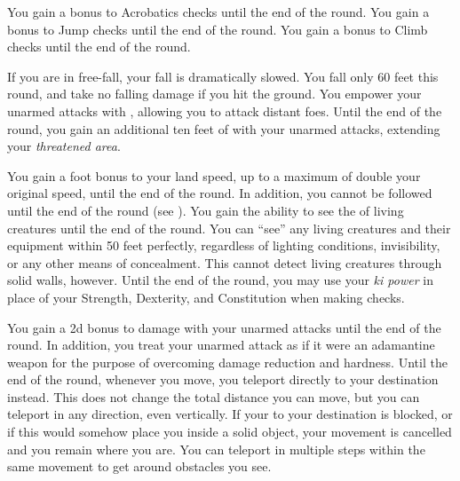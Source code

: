             You gain a  bonus to Acrobatics checks until the end of the round.
            You gain a  bonus to Jump checks until the end of the round.
            You gain a  bonus to Climb checks until the end of the round.

            If you are in free-fall, your fall is dramatically slowed.
            You fall only 60 feet this round, and take no falling damage if you hit the ground.
            You empower your unarmed attacks with \ki, allowing you to attack distant foes.
            Until the end of the round, you gain an additional ten feet of  with your unarmed attacks, extending your \textit{threatened area}.

            You gain a  foot bonus to your land speed, up to a maximum of double your original speed, until the end of the round.
            In addition, you cannot be followed until the end of the round (see ).
            You gain the ability to see the \ki of living creatures until the end of the round.
            You can ``see'' any living creatures and their equipment within 50 feet perfectly, regardless of lighting conditions, invisibility, or any other means of concealment.
            This cannot detect living creatures through solid walls, however.
            Until the end of the round, you may use your \textit{ki power} in place of your Strength, Dexterity, and Constitution when making checks.

            You gain a \plus2d bonus to damage with your unarmed attacks until the end of the round.
            In addition, you treat your unarmed attack as if it were an adamantine weapon for the purpose of overcoming damage reduction and hardness.
            Until the end of the round, whenever you move, you teleport directly to your destination instead.
            This does not change the total distance you can move, but you can teleport in any direction, even vertically.
            If your  to your destination is blocked, or if this would somehow place you inside a solid object, your movement is cancelled and you remain where you are.
            You can teleport in multiple steps within the same movement to get around obstacles you see.

